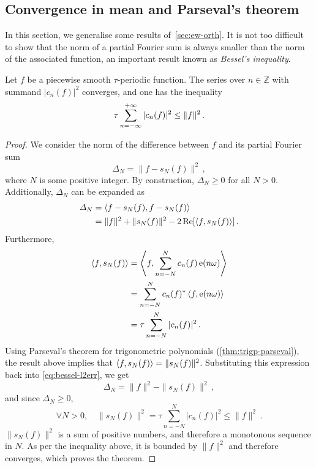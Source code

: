 \subsection{Convergence in mean and Parseval's theorem}
In this section, we generalise some results of~\cref{sec:ew-orth}. It is not too difficult to
show that the norm of a partial Fourier sum is always smaller than the norm of the associated function,
an important result known as \emph{Bessel's inequality}.
\begin{theorem}
  \label{thm:bessel}
  Let $f$ be a piecewise smooth $\tau$-periodic function. The series over $n\in\mathbb{Z}$
  with summand $|c_n(f)|^2$ converges, and one has the inequality
  \begin{equation}
    \tau\sum_{n=-\infty}^{+\infty}|c_n(f)|^2\leq\|f\|^2\,.
  \end{equation}
\end{theorem}
\begin{proof}
  We consider the norm of the difference between $f$ and its partial Fourier sum
  \begin{equation}
    \Delta_N=\|f-s_N(f)\|^2\,,
  \end{equation}
  where $N$ is some positive integer. By construction, $\Delta_N\geq 0$ for all $N>0$.
  Additionally, $\Delta_N$ can be expanded as
  \begin{align}
    \Delta_N&=\braket{f-s_N(f),f-s_N(f)}\\
    &=\|f\|^2+\|s_N(f)\|^2-2\operatorname{Re}[\braket{f,s_N(f)}]\,.\label{eq:bessel-l2err}
  \end{align}
  Furthermore,
  \begin{align}
    \braket{f,s_N(f)}&=\Braket{f,\sum_{n=-N}^{N}c_n(f)\operatorname{e}(n\omega)}\\
    &=\sum_{n=-N}^{N}c_n(f)^*\braket{f,\operatorname{e}(n\omega)}\\
    &=\tau\sum_{n=-N}^{N}|c_n(f)|^2\,.
  \end{align}
  Using Parseval's theorem for trigonometric polynomials (\cref{thm:trigp-parseval}), the result
  above implies that $\braket{f,s_N(f)}=\|s_N(f)\|^2$. Substituting this expression back into
  \cref{eq:bessel-l2err}, we get
  \begin{equation}
    \Delta_N=\|f\|^2-\|s_N(f)\|^2\,,
  \end{equation}
  and since $\Delta_N\geq 0$,
  \begin{equation}
    \forall N>0,\quad \|s_N(f)\|^2=\tau\sum_{n=-N}^{N}|c_n(f)|^2\leq \|f\|^2\,.
  \end{equation}
  $\|s_N(f)\|^2$ is a sum of positive numbers, and therefore a monotonous sequence in $N$. As per the inequality above, it is bounded by $\|f\|^2$ and therefore converges, which proves the theorem.
\end{proof}
